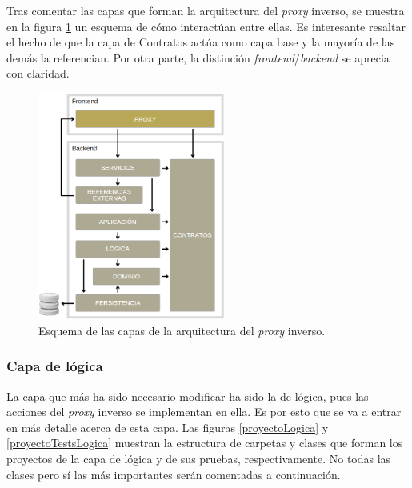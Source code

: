 \documentclass[11pt,spanish,listoffigures]{tfgetsinf}
\begin{document}
Tras comentar las capas que forman la arquitectura del \emph{proxy} inverso, se muestra en la figura \ref{arquitectura} un esquema de cómo interactúan entre ellas. Es interesante resaltar el hecho de que la capa de Contratos actúa como capa base y la mayoría de las demás la referencian. Por otra parte, la distinción \emph{frontend}/\emph{backend} se aprecia con claridad.

\begin{figure}[ht]
\centering
\includegraphics[width=0.55\textwidth]{imagenes/arquitectura}
\caption{Esquema de las capas de la arquitectura del \emph{proxy} inverso.}
	\label{arquitectura}
\end{figure}


			\subsubsection{Capa de lógica}

La capa que más ha sido necesario modificar ha sido la de lógica, pues las acciones del \emph{proxy} inverso se implementan en ella. Es por esto que se va a entrar en más detalle acerca de esta capa. Las figuras \ref{proyectoLogica} y \ref{proyectoTestsLogica} muestran la estructura de carpetas y clases que forman los proyectos de la capa de lógica y de sus pruebas, respectivamente. No todas las clases pero sí las más importantes serán comentadas a continuación.
\end{document}
